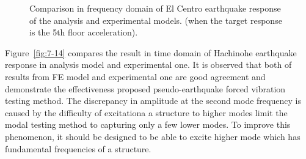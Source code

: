 \begin{figure}[!ht]
{   \label{fig:7-13e}\hfill
}
\caption{Comparison in frequency domain of El Centro earthquake response of the analysis and experimental models. (when the target response is the 5th floor acceleration).}
\label{fig:7-13}
\end{figure}

Figure~\ref{fig:7-14} compares the result in time domain of Hachinohe earthquake response in analysis model and experimental one. It is observed that both of results from FE model and experimental one are good agreement and demonstrate the effectiveness proposed pseudo-earthquake forced vibration testing method. The discrepancy in amplitude at the second mode frequency is caused by the difficulty of excitationa a structure to higher modes limit the modal testing method to capturing only a few lower modes. To improve this phenomenon, it should be designed to be able to excite higher mode which has fundamental frequencies of a structure.

